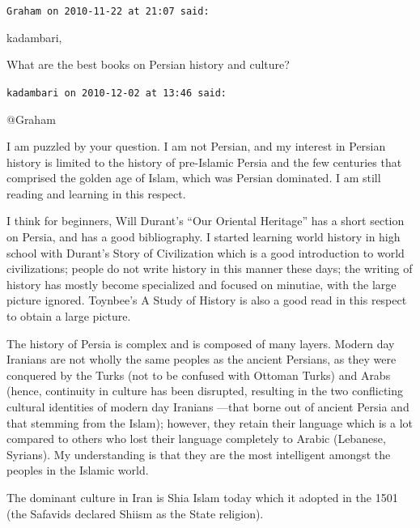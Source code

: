 \begin{footnotesize}
\begin{sffamily}
\hfill

\texttt{Graham on 2010-11-22 at 21:07 said:}

kadambari,

What are the best books on Persian history and culture?

\hfill

\texttt{kadambari on 2010-12-02 at 13:46 said:}

@Graham

I am puzzled by your question. I am not Persian, and my interest in Persian history is limited to the history of pre-Islamic Persia and the few centuries that comprised the golden age of Islam, which was Persian dominated. I am still reading and learning in this respect.

I think for beginners, Will Durant's ``Our Oriental Heritage'' has a short section on Persia, and has a good bibliography. I started learning world history in high school with Durant's Story of Civilization which is a good introduction to world civilizations; people do not write history in this manner these days; the writing of history has mostly become specialized and focused on minutiae, with the large picture ignored. Toynbee's A Study of History is also a good read in this respect to obtain a large picture.

The history of Persia is complex and is composed of many layers. Modern day Iranians are not wholly the same peoples as the ancient Persians, as they were conquered by the Turks (not to be confused with Ottoman Turks) and Arabs (hence, continuity in culture has been disrupted, resulting in the two conflicting cultural identities of modern day Iranians ---that borne out of ancient Persia and that stemming from the Islam); however, they retain their language which is a lot compared to others who lost their language completely to Arabic (Lebanese, Syrians). My understanding is that they are the most intelligent amongst the peoples in the Islamic world.

The dominant culture in Iran is Shia Islam today which it adopted in the 1501 (the Safavids declared Shiism as the State religion).


\end{sffamily}
\end{footnotesize}
